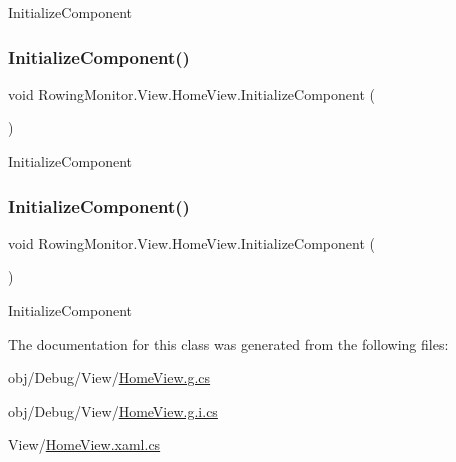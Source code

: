 Initialize\+Component 

\mbox{\label{class_rowing_monitor_1_1_view_1_1_home_view_af517b7b90bd5fd7c31122f3058e32d4c}} 
\subsubsection{\texorpdfstring{Initialize\+Component()}{InitializeComponent()}\hspace{0.1cm}{\footnotesize\ttfamily [3/4]}}
{\footnotesize\ttfamily void Rowing\+Monitor.\+View.\+Home\+View.\+Initialize\+Component (\begin{DoxyParamCaption}{ }\end{DoxyParamCaption})}



Initialize\+Component 

\mbox{\label{class_rowing_monitor_1_1_view_1_1_home_view_af517b7b90bd5fd7c31122f3058e32d4c}} 
\subsubsection{\texorpdfstring{Initialize\+Component()}{InitializeComponent()}\hspace{0.1cm}{\footnotesize\ttfamily [4/4]}}
{\footnotesize\ttfamily void Rowing\+Monitor.\+View.\+Home\+View.\+Initialize\+Component (\begin{DoxyParamCaption}{ }\end{DoxyParamCaption})}



Initialize\+Component 



The documentation for this class was generated from the following files\+:\begin{DoxyCompactItemize}
\item 
obj/\+Debug/\+View/\hyperlink{_debug_2_view_2_home_view_8g_8cs}{Home\+View.\+g.\+cs}\item 
obj/\+Debug/\+View/\hyperlink{_debug_2_view_2_home_view_8g_8i_8cs}{Home\+View.\+g.\+i.\+cs}\item 
View/\hyperlink{_home_view_8xaml_8cs}{Home\+View.\+xaml.\+cs}\end{DoxyCompactItemize}
